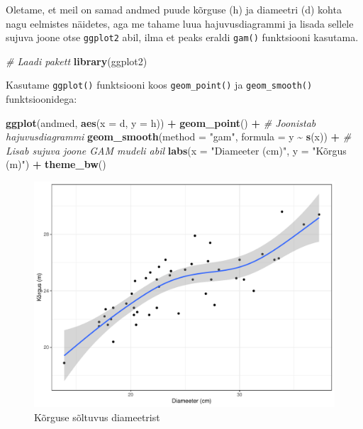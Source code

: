 \documentclass[
]{book}
\newenvironment{Shaded}{\begin{snugshade}}{\end{snugshade}}
\newcommand{\AttributeTok}[1]{\textcolor[rgb]{0.13,0.29,0.53}{#1}}
\newcommand{\CommentTok}[1]{\textcolor[rgb]{0.56,0.35,0.01}{\textit{#1}}}
\newcommand{\FunctionTok}[1]{\textcolor[rgb]{0.13,0.29,0.53}{\textbf{#1}}}
\newcommand{\NormalTok}[1]{#1}
\newcommand{\SpecialCharTok}[1]{\textcolor[rgb]{0.81,0.36,0.00}{\textbf{#1}}}
\newcommand{\StringTok}[1]{\textcolor[rgb]{0.31,0.60,0.02}{#1}}
\renewenvironment{Shaded} {\begin{snugshade}\footnotesize} {\end{snugshade}}
\begin{document}
Oletame, et meil on samad andmed puude kõrguse (h) ja diameetri (d) kohta nagu eelmistes näidetes, aga me tahame luua hajuvusdiagrammi ja lisada sellele sujuva joone otse \texttt{ggplot2} abil, ilma et peaks eraldi \texttt{gam()} funktsiooni kasutama.

\begin{Shaded}
\begin{Highlighting}[]
\CommentTok{\# Laadi pakett}
\FunctionTok{library}\NormalTok{(ggplot2)}
\end{Highlighting}
\end{Shaded}

Kasutame \texttt{ggplot()} funktsiooni koos \texttt{geom\_point()} ja \texttt{geom\_smooth()} funktsioonidega:

\begin{Shaded}
\begin{Highlighting}[]
\FunctionTok{ggplot}\NormalTok{(andmed, }\FunctionTok{aes}\NormalTok{(}\AttributeTok{x =}\NormalTok{ d, }\AttributeTok{y =}\NormalTok{ h)) }\SpecialCharTok{+}
  \FunctionTok{geom\_point}\NormalTok{() }\SpecialCharTok{+}  \CommentTok{\# Joonistab hajuvusdiagrammi}
  \FunctionTok{geom\_smooth}\NormalTok{(}\AttributeTok{method =} \StringTok{"gam"}\NormalTok{, }\AttributeTok{formula =}\NormalTok{ y }\SpecialCharTok{\textasciitilde{}} \FunctionTok{s}\NormalTok{(x)) }\SpecialCharTok{+}  \CommentTok{\# Lisab sujuva joone GAM mudeli abil}
  \FunctionTok{labs}\NormalTok{(}\AttributeTok{x =} \StringTok{"Diameeter (cm)"}\NormalTok{, }\AttributeTok{y =} \StringTok{"Kõrgus (m)"}\NormalTok{) }\SpecialCharTok{+}
  \FunctionTok{theme\_bw}\NormalTok{()}
\end{Highlighting}
\end{Shaded}

\begin{figure}[!ht]
\includegraphics[width=0.8\linewidth]{_main_files/figure-latex/unnamed-chunk-91-1} \caption{Kõrguse sõltuvus diameetrist}\label{fig:unnamed-chunk-91}
\end{figure}
\end{document}
